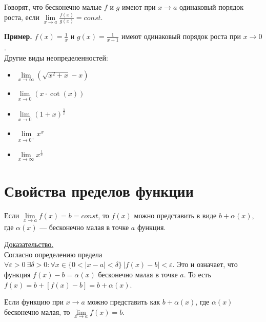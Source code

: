 \documentclass{article}
\begin{document}
\begin{definition}
    Говорят, что бесконечно малые \(f\) и \(g\) имеют при \(x \to a\) одинаковый порядок роста, если \(\displaystyle \lim\limits_{x \to a}\frac{f(x)}{g(x)} = const\).    
\end{definition}
\noindent
\textbf{Пример.} \(\displaystyle f(x) = \frac{1}{x}\) и \(\displaystyle g(x) = \frac{1}{x + 1}\) имеют одинаковый порядок роста при \(x \to 0\).\\

\noindent
Другие виды неопределенностей:
\begin{itemize}
    \item{\makebox[1.5cm]{\(\infty - \infty\):\hfill} \(\displaystyle \lim\limits_{x \to \infty}(\sqrt{x^2 + x} - x)\)} 
    \item{\makebox[1.5cm]{\(0 \cdot \infty\):\hfill} \(\displaystyle \lim\limits_{x \to 0}(x \cdot \cot(x))\)}  
    \item{ \(\displaystyle \lim\limits_{x \to 0}(1 + x)^{\frac{1}{x}}\)} 
    \item{ \(\displaystyle \lim\limits_{x \to 0^{+}}x^{x}\)}
    \item{ \(\displaystyle \lim\limits_{x \to \infty} x^{\frac{1}{x}}\)}
\end{itemize}

\section{Свойства пределов функции}
\begin{lemma}
    Если \(\lim\limits_{x \to a}f(x) = b = const\), то \(f(x)\) можно представить в виде \(\displaystyle b + \alpha(x)\), где \(\displaystyle \alpha(x)\) --- бесконечно малая в точке \(a\) функция.     
\end{lemma}
\noindent
\underline{Доказательство.}\\[0.1cm]
Согласно определению предела \(\displaystyle \forall \varepsilon > 0\ \exists \delta > 0: \forall x \in \{0 < \vert x - a \vert < \delta \}\ \vert f(x) - b \vert < \varepsilon\). Это и означает, что функция \(\displaystyle f(x) - b = \alpha(x)\) бесконечно малая в точке \(a\). То есть
\(\displaystyle f(x) = b + [f(x) - b] = b + \alpha(x)\).
\begin{lemma}
    Если функцию при \(x \to a\) можно представить как \(\displaystyle b + \alpha(x)\), где \(\displaystyle \alpha(x)\) бесконечно малая, то \(\displaystyle \lim\limits_{x \to a}f(x) = b\).  
\end{lemma}    
\end{document}
